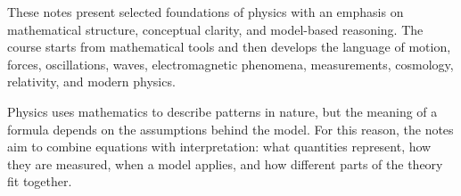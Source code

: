 These notes present selected foundations of physics with an emphasis on mathematical structure, conceptual clarity, and model-based reasoning. The course starts from mathematical tools and then develops the language of motion, forces, oscillations, waves, electromagnetic phenomena, measurements, cosmology, relativity, and modern physics.

Physics uses mathematics to describe patterns in nature, but the meaning of a formula depends on the assumptions behind the model. For this reason, the notes aim to combine equations with interpretation: what quantities represent, how they are measured, when a model applies, and how different parts of the theory fit together.
